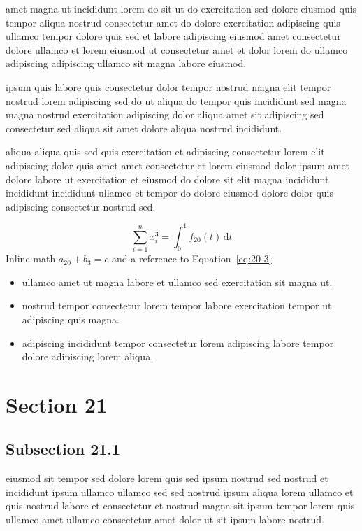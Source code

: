 \documentclass{article}
\begin{document}
amet magna ut incididunt lorem do sit ut do exercitation sed dolore eiusmod quis tempor aliqua nostrud consectetur amet do dolore exercitation adipiscing quis ullamco tempor dolore quis sed et labore adipiscing eiusmod amet consectetur dolore ullamco et lorem eiusmod ut consectetur amet et dolor lorem do ullamco adipiscing adipiscing ullamco sit magna labore eiusmod.

ipsum quis labore quis consectetur dolor tempor nostrud magna elit tempor nostrud lorem adipiscing sed do ut aliqua do tempor quis incididunt sed magna magna nostrud exercitation adipiscing dolor aliqua amet sit adipiscing sed consectetur sed aliqua sit amet dolore aliqua nostrud incididunt.

aliqua aliqua quis sed quis exercitation et adipiscing consectetur lorem elit adipiscing dolor quis amet amet consectetur et lorem eiusmod dolor ipsum amet dolore labore ut exercitation et eiusmod do dolore sit elit magna incididunt incididunt incididunt ullamco et tempor do dolore eiusmod dolore dolor quis adipiscing consectetur nostrud sed.

\begin{equation}\label{eq:20-3}
  \sum_{i=1}^{n} x_i^{3} = \int_0^1 f_{20}(t)\,\mathrm{d}t
\end{equation}
Inline math $a_{20} + b_{3} = c$ and a reference to Equation~\eqref{eq:20-3}.

\begin{itemize}
  \item ullamco amet ut magna labore et ullamco sed exercitation sit magna ut.
  \item nostrud tempor consectetur lorem tempor labore exercitation tempor ut adipiscing quis magna.
  \item adipiscing incididunt tempor consectetur lorem adipiscing labore tempor dolore adipiscing lorem aliqua.
\end{itemize}

\section{Section 21}\label{sec:21}
\subsection{Subsection 21.1}\label{sec:21-1}
eiusmod sit tempor sed dolore lorem quis sed ipsum nostrud sed nostrud et incididunt ipsum ullamco ullamco sed sed nostrud ipsum aliqua lorem ullamco et quis nostrud labore et consectetur et nostrud magna sit ipsum tempor lorem quis ullamco amet ullamco consectetur amet dolor ut sit ipsum labore nostrud.
\end{document}
